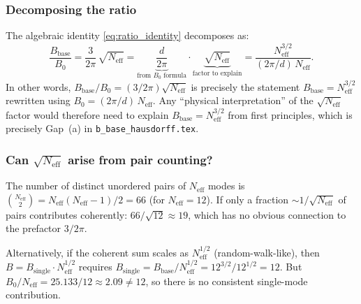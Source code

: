 \documentclass[11pt,a4paper]{article}
\theoremstyle{definition}
\theoremstyle{remark}
\begin{document}
\subsubsection{Decomposing the ratio}

The algebraic identity \eqref{eq:ratio_identity} decomposes as:
\begin{equation}
  \frac{B_{\mathrm{base}}}{B_0}
  = \frac{3}{2\pi}\,\sqrt{N_{\mathrm{eff}}}
  = \underbrace{\frac{d}{2\pi}}_{\text{from }B_0\text{ formula}}
    \cdot \underbrace{\sqrt{N_{\mathrm{eff}}}}_{\text{factor to explain}}
  = \frac{N_{\mathrm{eff}}^{3/2}}{(2\pi/d)\,N_{\mathrm{eff}}}.
  \label{eq:ratio_decomposed}
\end{equation}
In other words, $B_{\mathrm{base}}/B_0 = (3/2\pi)\sqrt{N_{\mathrm{eff}}}$ is precisely
the statement $B_{\mathrm{base}} = N_{\mathrm{eff}}^{3/2}$ rewritten using $B_0 = (2\pi/d)\,N_{\mathrm{eff}}$.
Any ``physical interpretation'' of the $\sqrt{N_{\mathrm{eff}}}$ factor would therefore
need to explain $B_{\mathrm{base}} = N_{\mathrm{eff}}^{3/2}$ from first principles,
which is precisely Gap~(a) in \texttt{b\_base\_hausdorff.tex}.

\subsubsection{Can $\sqrt{N_{\mathrm{eff}}}$ arise from pair counting?}

The number of distinct unordered pairs of $N_{\mathrm{eff}}$ modes is
$\binom{N_{\mathrm{eff}}}{2} = N_{\mathrm{eff}}(N_{\mathrm{eff}}-1)/2 = 66$ (for $N_{\mathrm{eff}} = 12$).
If only a fraction $\sim 1/\sqrt{N_{\mathrm{eff}}}$ of pairs contributes coherently:
$66 / \sqrt{12} \approx 19$, which has no obvious connection to the prefactor $3/2\pi$.

Alternatively, if the coherent sum scales as $N_{\mathrm{eff}}^{1/2}$ (random-walk-like),
then $B = B_{\mathrm{single}} \cdot N_{\mathrm{eff}}^{1/2}$ requires
$B_{\mathrm{single}} = B_{\mathrm{base}} / N_{\mathrm{eff}}^{1/2} = 12^{3/2}/12^{1/2} = 12$.
But $B_0/N_{\mathrm{eff}} = 25.133/12 \approx 2.09 \ne 12$,
so there is no consistent single-mode contribution.
\end{document}
